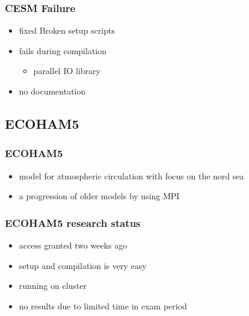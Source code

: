 \documentclass[compress]{beamer}
\begin{document}
\begin{frame}
    \frametitle{CESM Failure}
    	\begin{itemize}
		    \item fixed Broken setup scripts
		    \item fails during compilation
		    \begin{itemize}
		        \item parallel IO library
		    \end{itemize}
		    \item no documentation
		\end{itemize}
\end{frame}

\subsection{ECOHAM5}
\begin{frame}
	\frametitle{ECOHAM5}
	\begin{itemize}
		\item model for atmospheric circulation with focus on the nord sea \cite{echam}
        \item a progression of older models by using MPI
	\end{itemize}
\end{frame}

\begin{frame}
	\frametitle{ECOHAM5 research status}
	\begin{itemize}
		\item access granted two weeks ago
		\item setup and compilation is very easy
		\item running on cluster
		\item no results due to limited time in exam period
	\end{itemize}
\end{frame}
\end{document}
